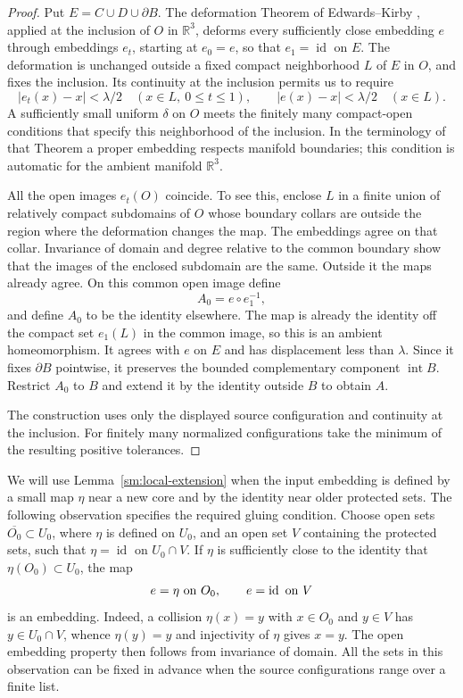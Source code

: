 \documentclass[11pt]{article}
\numberwithin{equation}{section}
\theoremstyle{definition}
\theoremstyle{remark}
\begin{document}
\begin{proof}
Put $E=C\cup D\cup\partial B$.  The deformation Theorem of
Edwards--Kirby \cite[Theorem~5.1]{EdwardsKirby1971}, applied at the
inclusion of $O$ in $\mathbb R^3$, deforms every sufficiently close embedding
$e$ through embeddings $e_t$, starting at $e_0=e$, so that
$e_1=\operatorname{id}$ on $E$.  The deformation is unchanged outside a fixed
compact neighborhood $L$ of $E$ in $O$, and fixes the inclusion.
Its continuity at the inclusion permits us to require
\[
 |e_t(x)-x|<\lambda/2\quad(x\in L,\ 0\le t\le1),
 \qquad |e(x)-x|<\lambda/2\quad(x\in L).
\]
A sufficiently small uniform $\delta$ on $O$ meets the finitely many
compact-open conditions that specify this neighborhood of the
inclusion.  In the terminology of that Theorem a proper embedding
respects manifold boundaries; this condition is automatic for the
ambient manifold $\mathbb R^3$.

All the open images $e_t(O)$ coincide.  To see this, enclose $L$ in a
finite union of relatively compact subdomains of $O$ whose boundary collars are outside
the region where the deformation changes the map.  The embeddings
agree on that collar. Invariance of domain
\cite[Theorem~2B.3]{Hatcher2002} and degree relative to
the common boundary show that the images of the enclosed subdomain
are the same.  Outside it the maps already agree.
On this common open image define
\[
 A_0=e\circ e_1^{-1},
\]
and define $A_0$ to be the identity elsewhere.  The map is already
the identity off the compact set $e_1(L)$ in the common image, so
this is an ambient homeomorphism.  It agrees with $e$ on $E$ and has
displacement less than $\lambda$.  Since it fixes $\partial B$
pointwise, it preserves the bounded complementary component
$\operatorname{int}B$.  Restrict $A_0$ to $B$ and extend it by the
identity outside $B$ to obtain $A$.

The construction uses only the displayed source configuration and
continuity at the inclusion.  For finitely many normalized
configurations take the minimum of the resulting positive tolerances.
\end{proof}

We will use Lemma~\ref{sm:local-extension} when the input embedding is
defined by a small map $\eta$ near a new core and by the identity near
older protected sets.  The following observation specifies the required
gluing condition.  Choose open sets
$\overline{O_0}\subset U_0$, where $\eta$ is defined on $U_0$, and
an open set $V$ containing the protected sets, such that
$\eta=\operatorname{id}$ on $U_0\cap V$.  If $\eta$ is sufficiently close to
the identity that $\eta(O_0)\subset U_0$, the map
\begin{equation}
 \label{sm:patched-embedding}
 e=\eta\ \hbox{on }O_0,\qquad e=\operatorname{id}\ \hbox{on }V
\end{equation}
is an embedding.  Indeed, a collision $\eta(x)=y$ with
$x\in O_0$ and $y\in V$ has $y\in U_0\cap V$, whence
$\eta(y)=y$ and injectivity of $\eta$ gives $x=y$.  The open
embedding property then follows from invariance of domain.  All the
sets in this observation can be fixed in advance when the source
configurations range over a finite list.
\end{document}
